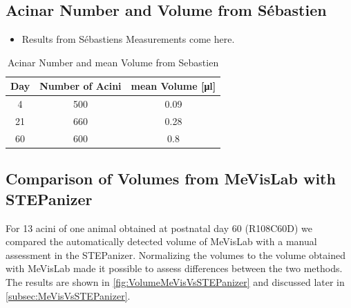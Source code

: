 \documentclass[%
	paper=a4,%
	abstract=true,%
	]{scrartcl}
\begin{document}
\subsection{Acinar Number and Volume from Sébastien}
\begin{itemize}
	\item Results from Sébastiens Measurements come here.
\end{itemize}

\begin{table}[htb]
	\centering
	\caption{Acinar Number and mean Volume from Sebastien}
	\begin{tabular}{ccc}
	\toprule
	Day & Number of Acini & mean Volume [\si{\micro\litre}]\\
	\midrule
	4	& 500	& 0.09 \\
	21	& 660	& 0.28 \\
	60	& 600	& 0.8 \\
	\bottomrule
	\end{tabular}
	\label{tab:data sebastien}
\end{table}

\subsection{Comparison of Volumes from MeVisLab with STEPanizer}
For 13 acini of one animal obtained at postnatal day 60 (R108C60D) we compared the automatically detected volume of MeVisLab with a manual assessment in the STEPanizer. Normalizing the volumes to the volume obtained with MeVisLab made it possible to assess differences between the two methods. The results are shown in \autoref{fig:VolumeMeVisVsSTEPanizer} and discussed later in \autoref{subsec:MeVisVsSTEPanizer}.
\end{document}
